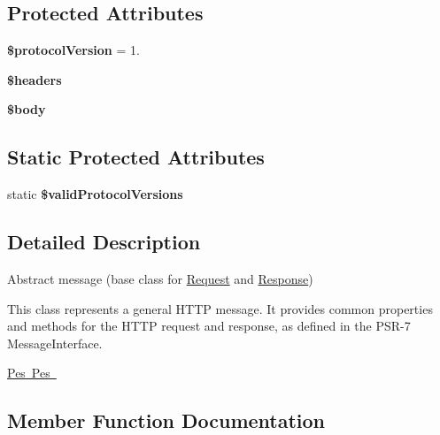 \subsection*{Protected Attributes}
\begin{DoxyCompactItemize}
\item 
\mbox{\label{class_pes_1_1_http_1_1_message_af2ca53cd4f10c15159b38f779039efba}} 
{\bfseries \$protocol\+Version} = \textquotesingle{}1.\textquotesingle{}
\item 
\mbox{\label{class_pes_1_1_http_1_1_message_a52500036ee807241b8b4b7e2367c49ef}} 
{\bfseries \$headers}
\item 
\mbox{\label{class_pes_1_1_http_1_1_message_a26b9f9373f7bb79dfcf8a86dff086b45}} 
{\bfseries \$body}
\end{DoxyCompactItemize}
\subsection*{Static Protected Attributes}
\begin{DoxyCompactItemize}
\item 
static {\bfseries \$valid\+Protocol\+Versions}
\end{DoxyCompactItemize}


\subsection{Detailed Description}
Abstract message (base class for \mbox{\hyperlink{class_pes_1_1_http_1_1_request}{Request}} and \mbox{\hyperlink{class_pes_1_1_http_1_1_response}{Response}})

This class represents a general H\+T\+TP message. It provides common properties and methods for the H\+T\+TP request and response, as defined in the P\+S\+R-\/7 Message\+Interface.

\mbox{\hyperlink{}{Pes  Pes }}

\subsection{Member Function Documentation}
\mbox{\label{class_pes_1_1_http_1_1_message_a83c2703c91959192f759992ad5640b67}} 
